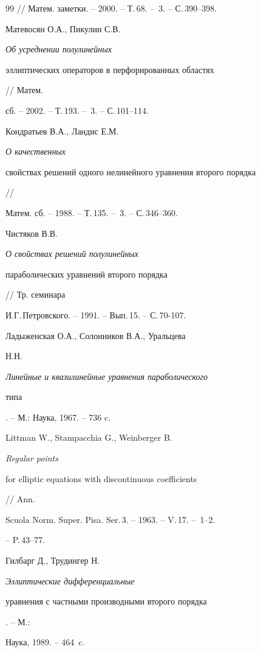\begin{thebibliography}{99}
// Матем. заметки. -- 2000. -- Т.\,68. -- \No\,3. -- С.\,390--398.




Матевосян О.А., Пикулин С.В. {\it Об усреднении полулинейных


эллиптических операторов в перфорированных областях} // Матем.


сб. -- 2002. -- Т.\,193. -- \No\,3. -- С.\,101--114.




Кондратьев В.А., Ландис Е.М. {\it О качественных


свойствах решений одного нелинейного уравнения второго порядка} //


Матем. сб. -- 1988. -- Т.\,135. -- \No\,3. -- С.\,346--360.




Чистяков В.В. {\it О свойствах решений полулинейных


параболических уравнений второго порядка} // Тр. семинара


И.Г.\,Петровского. -- 1991. -- Вып.\,15. -- С.\,70-107.




Ладыженская О.А., Солонников В.А., Уральцева


Н.Н. {\it Линейные и квазилинейные уравнения параболического


типа}. -- М.: Наука, 1967. -- 736 c.




Littman W., Stampacchia G., Weinberger B. {\it Regular points


for elliptic equations with discontinuous coefficients} // Ann.


Scuola Norm. Super. Pisa. Ser.\,3. -- 1963. -- V.\,17. -- \No\,1--2.


-- P.\,43--77.




Гилбарг Д., Трудингер Н. {\it Эллиптические дифференциальные


уравнения с частными производными второго порядка}. -- М.:


Наука, 1989. -- 464~c.





\end{thebibliography}





\vskip 2cm












\label{end}





